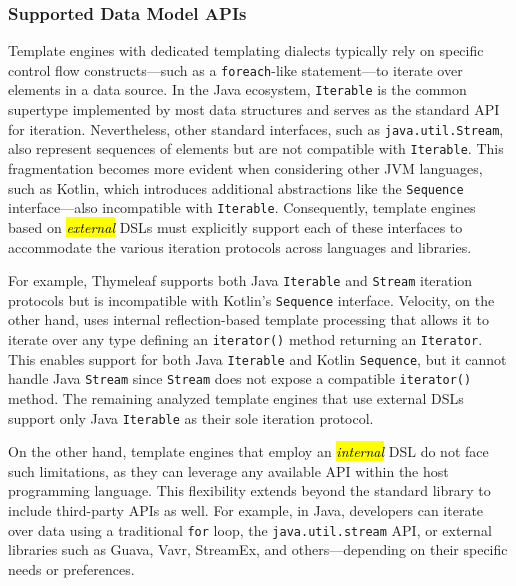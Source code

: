\documentclass[software,article,accept,pdftex,moreauthors]{Definitions/mdpi}
\begin{document}

\subsubsection{Supported Data Model APIs}\label{s2.1.2}

Template engines with dedicated templating dialects typically rely on specific
control flow constructs---such as a \texttt{foreach}-like statement---to iterate
over elements in a data source. In the Java ecosystem, \texttt{Iterable} is the
common supertype implemented by most data structures and serves as the standard
API for iteration. Nevertheless, other standard interfaces, such as
\texttt{java.util.Stream}, also represent sequences of elements but are not
compatible with \texttt{Iterable}. This fragmentation becomes more evident when
considering other JVM languages, such as Kotlin, which introduces additional
abstractions like the \texttt{Sequence} interface---also incompatible with
\texttt{Iterable}. Consequently, template engines based on \textit{\hl{external}}
DSLs must explicitly support each of these interfaces to accommodate the
various iteration protocols across languages and libraries.

For example, Thymeleaf supports both Java \texttt{Iterable} and \texttt{Stream}
iteration protocols but is incompatible with Kotlin's \texttt{Sequence}
interface.
Velocity, on the other hand, uses internal reflection-based template processing
that allows it to iterate over any type defining an \texttt{iterator()} method
returning an \texttt{Iterator}. This enables support for both Java
\texttt{Iterable} and Kotlin \texttt{Sequence}, but it cannot handle Java
\texttt{Stream} since \texttt{Stream} does not expose a compatible
\texttt{iterator()} method.
The remaining analyzed template engines that use external DSLs support only Java
\texttt{Iterable} as their sole iteration protocol.

On the other hand, template engines that employ an \textit{\hl{internal}} DSL do not
face such limitations, as they can leverage any available API within the host
programming language. This flexibility extends beyond the standard library to
include third-party APIs as well. For example, in Java, developers can iterate
over data using a traditional \texttt{for} loop, the \texttt{java.util.stream}
API, or external libraries such as Guava, Vavr, StreamEx, and \mbox{others---depending}
on their specific needs or preferences.
\end{document}
